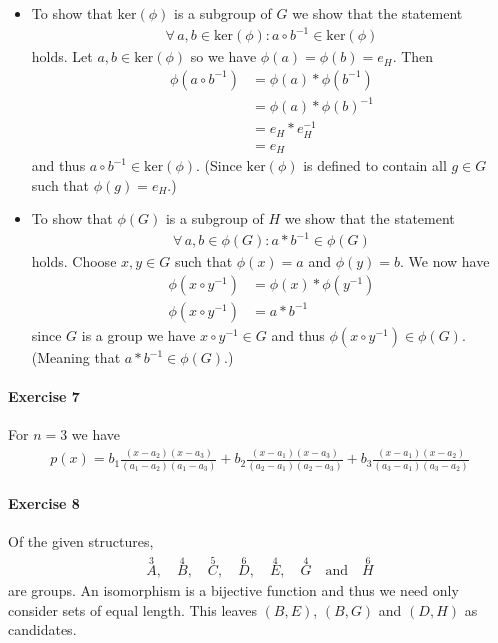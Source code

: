 \documentclass{article}
\begin{document}
\begin{itemize}
    \item To show that $\text{ker}(\phi)$ is a subgroup of $G$ we show that the statement
    \begin{align*}
        \forall\, a, b \in \text{ker}(\phi) :  a \circ b^{-1} \in \text{ker}(\phi)
    \end{align*}
    holds. Let $a, b \in \text{ker}(\phi)$ so we have $\phi(a) = \phi(b) = e_H$. Then
    \begin{align*}
        \phi(a \circ b^{-1}) &= \phi(a) * \phi(b^{-1}) \\
        &= \phi(a) * \phi(b)^{-1} \\
        &= e_H * e_H^{-1} \\
        &= e_H
    \end{align*}
    and thus $a \circ b^{-1} \in \text{ker}(\phi)$. (Since $\text{ker}(\phi)$ is defined to contain all $g \in G$ such that $\phi(g) = e_H$.)

    \item To show that $\phi(G)$ is a subgroup of $H$ we show that the statement
    \begin{align*}
        \forall\, a, b \in \phi(G):  a * b^{-1} \in \phi(G)
    \end{align*}
    holds. Choose $x, y \in G$ such that $\phi(x) = a$ and $\phi(y) = b$. We now have
    \begin{align*}
        \phi(x \circ y^{-1}) &= \phi(x) * \phi(y^{-1}) \\
        \phi(x \circ y^{-1}) &= a * b^{-1}
    \end{align*}
    since $G$ is a group we have $x \circ y^{-1} \in G$ and thus $\phi(x \circ y^{-1}) \in \phi(G)$. (Meaning that $a * b^{-1} \in \phi(G)$.)
\end{itemize}

\paragraph{Exercise 7}

For $n = 3$ we have
\begin{align*}
    p(x) = b_1 \frac{(x - a_2)(x - a_3)}{(a_1 - a_2)(a_1 - a_3)} + b_2 \frac{(x - a_1)(x - a_3)}{(a_2 - a_1)(a_2 - a_3)} + b_3 \frac{(x - a_1)(x - a_2)}{(a_3 - a_1)(a_3 - a_2)}
\end{align*}

\paragraph{Exercise 8}

Of the given structures,
\begin{align*}
    \overset{3}{A},\quad \overset{4}{B},\quad \overset{5}{C},\quad \overset{6}{D},\quad \overset{4}{E},\quad \overset{4}{G} \quad\text{and}\quad \overset{6}{H}
\end{align*}
are groups. An isomorphism is a bijective function and thus we need only consider sets of equal length. This leaves $(B, E)$, $(B, G)$ and $(D, H)$ as candidates. 
\end{document}
